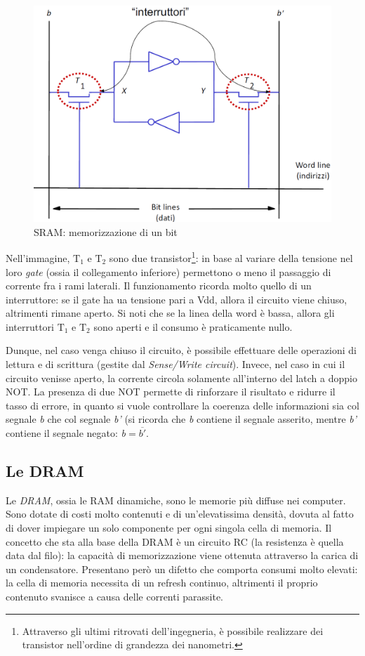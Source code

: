 \documentclass[class=book, crop=false, oneside]{standalone}
\begin{document}
\begin{figure}[H]
	\centering
	\includegraphics[width=\textwidth,keepaspectratio]{cella_SRAM.png}
	\caption{SRAM: memorizzazione di un bit}
\end{figure}

Nell'immagine, \(\textrm{T}_1\) e \(\textrm{T}_2\) sono due transistor\footnote{Attraverso gli ultimi ritrovati dell'ingegneria, è possibile realizzare dei transistor nell'ordine di grandezza dei nanometri.}: in base al variare della tensione nel loro \emph{gate} (ossia il collegamento inferiore) permettono o meno il passaggio di corrente fra i rami laterali. Il funzionamento ricorda molto quello di un interruttore: se il gate ha ua tensione pari a Vdd, allora il circuito viene chiuso, altrimenti rimane aperto. Si noti che se la linea della word è bassa, allora gli interruttori \(\textrm{T}_1\) e \(\textrm{T}_2\) sono aperti e il consumo è praticamente nullo.

Dunque, nel caso venga chiuso il circuito, è possibile effettuare delle operazioni di lettura e di scrittura (gestite dal \emph{Sense/Write circuit}). Invece, nel caso in cui il circuito venisse aperto, la corrente circola solamente all'interno del latch a doppio NOT. La presenza di due NOT permette di rinforzare il risultato e ridurre il tasso di errore, in quanto si vuole controllare la coerenza delle informazioni sia col segnale \emph{b} che col segnale \emph{b'} (si ricorda che \emph{b} contiene il segnale asserito, mentre \emph{b'} contiene il segnale negato: \emph{b}\(=\)\emph{\(\overline{b'}\)}.

\subsection{Le DRAM}
Le \emph{DRAM}, ossia le RAM dinamiche, sono le memorie più diffuse nei computer. Sono dotate di costi molto contenuti e di un'elevatissima densità, dovuta al fatto di dover impiegare un solo componente per ogni singola cella di memoria. Il concetto che sta alla base della DRAM è un circuito RC (la resistenza è quella data dal filo): la capacità di memorizzazione viene ottenuta attraverso la carica di un condensatore. Presentano però un difetto che comporta consumi molto elevati: la cella di memoria necessita di un refresh continuo, altrimenti il proprio contenuto svanisce a causa delle correnti parassite.
\end{document}
